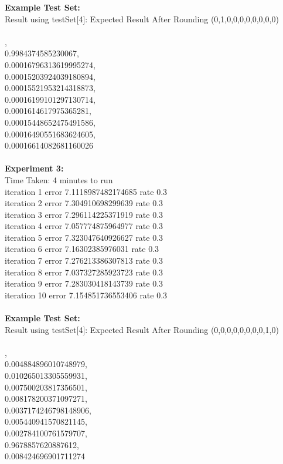 \documentclass[11pt]{article}
\begin{document}
\begin{page}
\noindent \textbf{Example Test Set:}\\
Result using testSet[4]: Expected Result After Rounding (0,1,0,0,0,0,0,0,0,0)\\\\

,\\
  0.9984374585230067,\\
  0.00016796313619995274,\\
  0.00015203924039180894,\\
  0.00015521953214318873,\\
  0.00016199101297130714,\\
  0.0001614617975365281,\\
  0.00015448652475491586,\\
  0.00016490551683624605,\\
  0.00016614082681160026\\\\

\noindent \textbf{Experiment 3:} \\
Time Taken: 4 minutes to run\\

\noindent iteration 1 error 7.1118987482174685 rate 0.3\\
iteration 2 error 7.304910698299639 rate 0.3\\
iteration 3 error 7.296114225371919 rate 0.3\\
iteration 4 error 7.057774875964977 rate 0.3\\
iteration 5 error 7.323047640926627 rate 0.3\\
iteration 6 error 7.16302385976031 rate 0.3\\
iteration 7 error 7.276213386307813 rate 0.3\\
iteration 8 error 7.037327285923723 rate 0.3\\
iteration 9 error 7.283030418143739 rate 0.3\\
iteration 10 error 7.154851736553406 rate 0.3\\\\

\noindent \textbf{Example Test Set:}\\
Result using testSet[4]: Expected Result After Rounding (0,0,0,0,0,0,0,0,1,0)\\\\

,\\
  0.004884896010748979,\\
  0.010265013305559931,\\
  0.007500203817356501,\\
  0.008178200371097271,\\
  0.0037174246798148906,\\
  0.005440941570821145,\\
  0.002784100761579707,\\
  0.9678857620887612,\\
  0.008424696901711274\\


\end{page}
\end{document}
